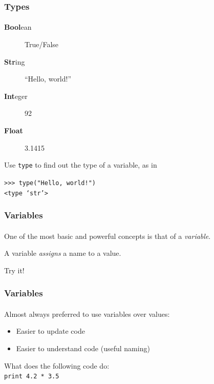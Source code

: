 \begin{frame}\frametitle{Types}
    \framesubtitle{}

\begin{description}
    \item[\textbf{Bool}ean] True/False
    \item[\textbf{Str}ing] ``Hello, world!''
    \item[\textbf{Int}eger] 92
    \item[\textbf{Float}] 3.1415
\end{description}

\vfill

Use \texttt{type} to find out the type of a variable, as in

\texttt{>>> type("Hello, world!")}\\
\texttt{<type `str'>}

\end{frame}

\begin{frame}\frametitle{Variables}
    \framesubtitle{}

    One of the most basic and powerful concepts is that of a \emph{variable}.

    \vfill

    A variable \emph{assigns} a name to a value.


    Try it!

\end{frame}

\begin{frame}\frametitle{Variables}
    \framesubtitle{}

    Almost always preferred to use variables over values:

    \begin{itemize}
        \item Easier to update code
        \item Easier to understand code (useful naming)
    \end{itemize}

    \vfill
    What does the following code do:\\
    \texttt{print 4.2 * 3.5}

    \pause


\end{frame}



